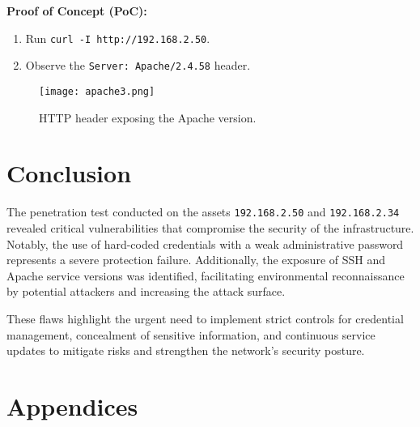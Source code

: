 \documentclass[a4paper,12pt]{article}
\begin{document}
\textbf{Proof of Concept (PoC):}  
\begin{enumerate}
    \item Run \texttt{curl -I http://192.168.2.50}.
    \item Observe the \texttt{Server: Apache/2.4.58} header.
\end{enumerate}

\begin{figure}[ht]
    \centering
    \texttt{[image: apache3.png]}
    \caption{HTTP header exposing the Apache version.}
\end{figure}

\clearpage

\section{Conclusion}

The penetration test conducted on the assets \texttt{192.168.2.50} and \texttt{192.168.2.34} revealed critical vulnerabilities that compromise the security of the infrastructure. Notably, the use of hard-coded credentials with a weak administrative password represents a severe protection failure. Additionally, the exposure of SSH and Apache service versions was identified, facilitating environmental reconnaissance by potential attackers and increasing the attack surface.

These flaws highlight the urgent need to implement strict controls for credential management, concealment of sensitive information, and continuous service updates to mitigate risks and strengthen the network’s security posture.

\section{Appendices}
\end{document}
